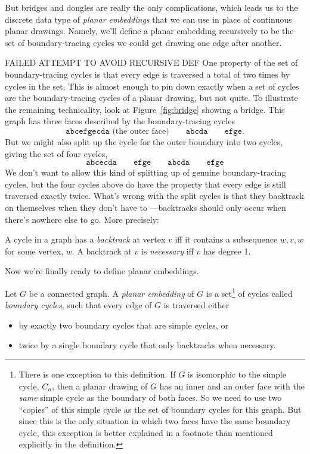 But bridges and dongles are really the only complications, which leads
us to the discrete data type of \emph{planar embeddings} that we can use
in place of continuous planar drawings.  Namely, we'll define a planar
embedding recursively to be the set of boundary-tracing cycles we could
get drawing one edge after another.

\iffalse  FAILED ATTEMPT TO AVOID RECURSIVE DEF
One property of the set of boundary-tracing cycles is that every
edge is traversed a total of two times by cycles in the set.  This is
almost enough to pin down exactly when a set of cycles are the
boundary-tracing cycles of a planar drawing, but not quite.  To illustrate
the remaining technicality, look at Figure~\ref{fig:bridge} showing a
bridge.  This graph has three faces described by the boundary-tracing
cycles
\[
\mathtt{abcefgecda} \text{ (the outer face)} \qquad \mathtt{abcda}\qquad
\mathtt{efge}.
\]
But we might also split up the cycle for the outer boundary into two
cycles, giving the set of four cycles,
\[
\mathtt{abcecda}\qquad \mathtt{efge} \qquad \mathtt{abcda}\qquad
\mathtt{efge}
\]
We don't want to allow this kind of splitting up of genuine
boundary-tracing cycles, but the four cycles above do have the property
that every edge is still traversed exactly twice.  What's wrong with the
split cycles is that they backtrack on themselves when they don't have to
---backtracks should only occur when there's nowhere else to go. More
precisely:
\begin{definition}
A cycle in a graph has a \emph{backtrack} at vertex $v$ iff it contains a
subsequence $w,v,w$ for some vertex, $w$.  A backtrack at $v$ is
\emph{necessary} iff $v$ has degree 1.
\end{definition}
Now we're finally ready to define planar embeddings.

Let $G$ be a connected graph.  A \emph{planar embedding} of $G$ is a
set\footnote{\label{C} There is one exception to this definition.  If $G$
is isomorphic to the simple cycle, $C_n$, then a planar drawing of $G$ has
an inner and an outer face with the \emph{same} simple cycle as the
boundary of both faces.  So we need to use two ``copies'' of this simple
cycle as the set of boundary cycles for this graph.  But since this is the
only situation in which two faces have the same boundary cycle, this
exception is better explained in a footnote than mentioned explicitly in
the definition.} of cycles called \emph{boundary cycles}, such that
every edge of $G$ is traversed either
\begin{itemize}
\item by exactly two boundary cycles that are simple cycles, or

\item twice by a single boundary cycle that only backtracks when
necessary.
\end{itemize}


